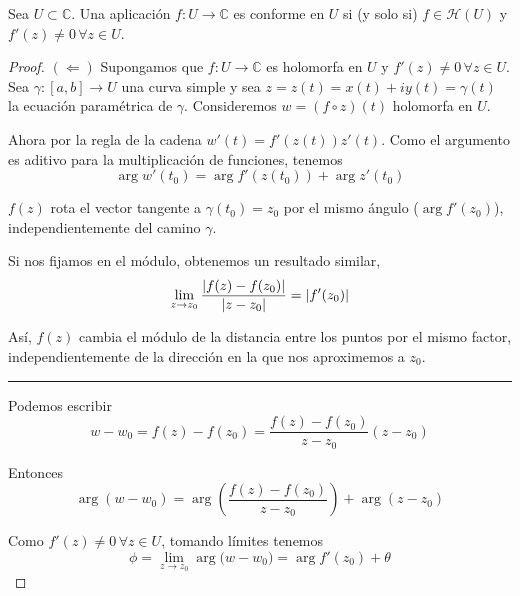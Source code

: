 \begin{prop}
Sea $U \subset \mathbb{C}$. Una aplicación $f: U \rightarrow \mathbb{C}$ es conforme en $U$ si (y solo si) $f \in \mathcal{H}(U)$ y $f'(z) \not = 0 \, \forall z \in U$.
\end{prop}

\begin{proof}
$(\Leftarrow)$ Supongamos que $f: U \rightarrow \mathbb{C}$ es holomorfa en $U$ y $f'(z) \not = 0 \, \forall z \in U$. Sea $\gamma: [a,b] \rightarrow U$ una curva simple y sea $z = z(t) = x(t) + iy(t) = \gamma (t)$ la ecuación paramétrica de $\gamma$. Consideremos $w = (f \circ  z)(t)$ holomorfa en $U$.

Ahora por la regla de la cadena $w'(t) = f'(z(t))z'(t)$. Como el argumento es aditivo para la multiplicación de funciones, tenemos
\begin{equation*}
\arg{w'(t_0)} = \arg{f'(z(t_0))} + \arg{z'(t_0)}
\end{equation*}

$f(z)$ rota el vector tangente a $\gamma(t_0) = z_0$ por el mismo ángulo ($\arg{f'(z_0)}$), independientemente del camino $\gamma$.

Si nos fijamos en el módulo, obtenemos un resultado similar,
\begin{equation*}
\lim_{z \rightarrow z_0} \dfrac{\left\lvert f(z) - f(z_0)\right\rvert}{\left\lvert z - z_0\right\rvert} = \left\lvert f'(z_0)\right\rvert
\end{equation*}

Así, $f(z)$ cambia el módulo de la distancia entre los puntos por el mismo factor, independientemente de la dirección en la que nos aproximemos a $z_0$. \\

\noindent\rule{8cm}{0.4pt}

Podemos escribir
\begin{equation*}
w - w_0 = f(z) - f(z_0) = \dfrac{f(z)-f(z_0)}{z - z_0} (z - z_0)
\end{equation*}

Entonces
\begin{equation*}
\arg{(w - w_0)} =  \arg{ \left( \dfrac{f(z)-f(z_0)}{z - z_0} \right)} + \arg{(z - z_0)}
\end{equation*}

Como $f'(z) \not = 0 \, \forall z \in U$, tomando límites tenemos
\begin{equation*}
\phi = \lim_{z \rightarrow z_0} \arg({w-w_0)}= \arg{f'(z_0)} + \theta
\end{equation*}


\end{proof}
